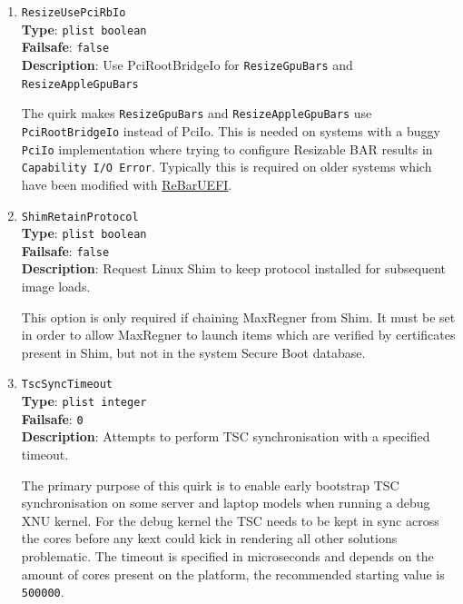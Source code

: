 \documentclass[]{article}
\begin{document}
\begin{enumerate}
  \emph{Note 1}: This quirk shall not be used to workaround macOS limitation
  to address BARs over 1 GB. \texttt{ResizeAppleGpuBars} should be used instead.

  \emph{Note 2}: While this quirk can increase GPU PCI BAR sizes, this will not
  work on most firmware as is, because the quirk does not relocate BARs in memory,
  and they will likely overlap. In most cases it is best to either update the
  firmware to the latest version or customise it with a specialised driver
  like \href{https://github.com/xCuri0/ReBarUEFI}{ReBarUEFI}.

\item
  \texttt{ResizeUsePciRbIo}\\
  \textbf{Type}: \texttt{plist\ boolean}\\
  \textbf{Failsafe}: \texttt{false}\\
  \textbf{Description}: Use PciRootBridgeIo for \texttt{ResizeGpuBars} and \texttt{ResizeAppleGpuBars}

  The quirk makes \texttt{ResizeGpuBars} and \texttt{ResizeAppleGpuBars} use \texttt{PciRootBridgeIo} instead of PciIo.
  This is needed on systems with a buggy \texttt{PciIo} implementation where trying to configure
  Resizable BAR results in \texttt{Capability I/O Error}. Typically this is required on
  older systems which have been modified with \href{https://github.com/xCuri0/ReBarUEFI}{ReBarUEFI}.

\item
  \texttt{ShimRetainProtocol}\\
  \textbf{Type}: \texttt{plist\ boolean}\\
  \textbf{Failsafe}: \texttt{false}\\
  \textbf{Description}: Request Linux Shim to keep protocol installed for subsequent image loads.

  This option is only required if chaining MaxRegner from Shim. It must be set in order to allow
  MaxRegner to launch items which are verified by certificates present in Shim, but not in the
  system Secure Boot database.

\item
  \texttt{TscSyncTimeout}\\
  \textbf{Type}: \texttt{plist\ integer}\\
  \textbf{Failsafe}: \texttt{0}\\
  \textbf{Description}: Attempts to perform TSC synchronisation with a specified timeout.

  The primary purpose of this quirk is to enable early bootstrap TSC synchronisation
  on some server and laptop models when running a debug XNU kernel. For the debug kernel
  the TSC needs to be kept in sync across the cores before any kext could kick in rendering
  all other solutions problematic. The timeout is specified in microseconds and depends on the
  amount of cores present on the platform, the recommended starting value is \texttt{500000}.


\end{enumerate}
\end{document}
